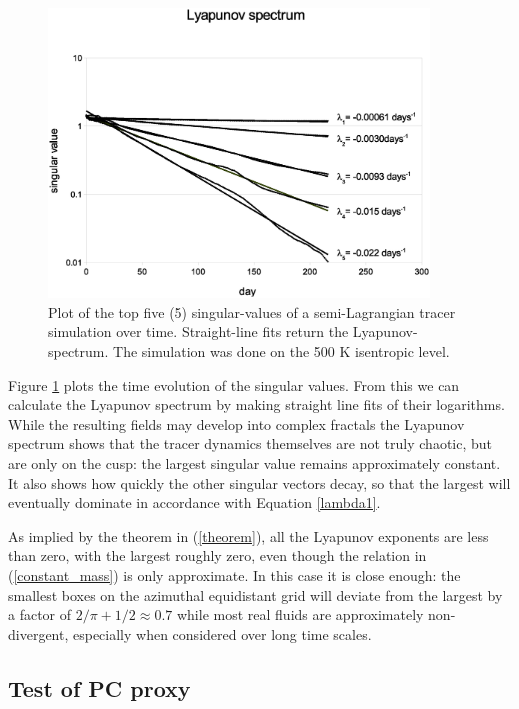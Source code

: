 \documentclass{article}
\begin{document}
\begin{figure}
\begin{center}
\includegraphics[width=0.9\textwidth]{lyap_spec.eps}
\caption{Plot of the top five (5) singular-values of a semi-Lagrangian
tracer simulation over time.  Straight-line fits return the Lyapunov-spectrum.
The simulation was done on the 500 K isentropic level.}
\label{lyap_spec}
\end{center}
\end{figure}

Figure \ref{lyap_spec} plots the time evolution of the singular values.
From this we can calculate the Lyapunov spectrum by making straight line
fits of their logarithms.
While the resulting fields may develop into complex fractals \citep{Mills2009}
the Lyapunov spectrum shows that the tracer dynamics themselves 
are not truly chaotic, but are
only on the cusp: the largest singular value remains approximately constant.
It also shows how quickly the other singular vectors decay,
so that the largest will eventually dominate in accordance with
Equation \ref{lambda1}.

As implied by the theorem in (\ref{theorem}), all the Lyapunov exponents
are less than zero, with the largest roughly zero, even though the
relation in (\ref{constant_mass}) is only approximate.
In this case it is close enough: the smallest boxes on the
azimuthal equidistant grid will deviate from the largest by
a factor of $2/\pi+1/2\approx0.7$
while most real fluids are approximately non-divergent, especially
when considered over long time scales.

\subsection{Test of PC proxy}
\end{document}
